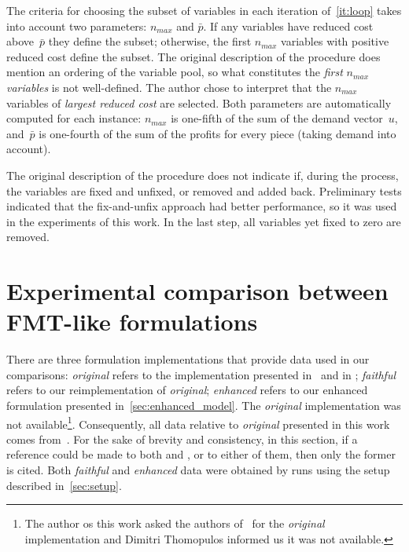 \documentclass[ppgc,tese,english,formais,babel]{iiufrgs}
\begin{document}
The criteria for choosing the subset of variables in each iteration of~\autoref{it:loop} takes into account two parameters: \(n_{max}\) and \(\bar{p}\). If any variables have reduced cost above~\(\bar{p}\) they define the subset; otherwise, the first \(n_{max}\) variables with positive reduced cost define the subset. The original description of the procedure does mention an ordering of the variable pool, so what constitutes the \emph{first} \(n_{max}\) \emph{variables} is not well-defined. The author chose to interpret that the \(n_{max}\) variables of \emph{largest reduced cost} are selected. Both parameters are automatically computed for each instance: \(n_{max}\) is one-fifth of the sum of the demand vector~\(u\), and~\(\bar{p}\) is one-fourth of the sum of the profits for every piece (taking demand into account).

The original description of the procedure does not indicate if, during the process, the variables are fixed and unfixed, or removed and added back.
Preliminary tests indicated that the fix-and-unfix approach had better performance, so it was used in the experiments of this work.
In the last step, all variables yet fixed to zero are removed.

\chapter{Experimental comparison between FMT-like formulations}
\label{sec:experimental_results}
\label{sec:furini_vs_enhanced_comparison}

There are three formulation implementations that provide data used in our comparisons:
\emph{original} refers to the implementation presented in~\citet{furini:2016} and in \citet{dimitri_thesis};
\emph{faithful} refers to our reimplementation of \emph{original};
\emph{enhanced} refers to our enhanced formulation presented in~\cref{sec:enhanced_model}.
The \emph{original} implementation was not available\footnote{
	The author os this work asked the authors of~\citet{furini:2016} for the \emph{original} implementation and Dimitri Thomopulos informed us it was not available.
}.
Consequently, all data relative to \emph{original} presented in this work comes from~\citet{dimitri_thesis}.
For the sake of brevity and consistency, in this section, if a reference could be made to both \citet{dimitri_thesis} and \citet{furini:2016}, or to either of them, then only the former is cited.
Both \emph{faithful} and \emph{enhanced} data were obtained by runs using the setup described in~\cref{sec:setup}.
\end{document}
